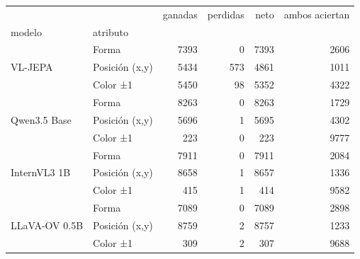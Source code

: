 \begin{tabular}{llrrrr}
\toprule
 &  & ganadas & perdidas & neto & ambos aciertan \\
modelo & atributo &  &  &  &  \\
\midrule
\multirow[t]{3}{*}{VL-JEPA} & Forma & 7393 & 0 & 7393 & 2606 \\
 & Posición (x,y) & 5434 & 573 & 4861 & 1011 \\
 & Color ±1 & 5450 & 98 & 5352 & 4322 \\
\cline{1-6}
\multirow[t]{3}{*}{Qwen3.5 Base} & Forma & 8263 & 0 & 8263 & 1729 \\
 & Posición (x,y) & 5696 & 1 & 5695 & 4302 \\
 & Color ±1 & 223 & 0 & 223 & 9777 \\
\cline{1-6}
\multirow[t]{3}{*}{InternVL3 1B} & Forma & 7911 & 0 & 7911 & 2084 \\
 & Posición (x,y) & 8658 & 1 & 8657 & 1336 \\
 & Color ±1 & 415 & 1 & 414 & 9582 \\
\cline{1-6}
\multirow[t]{3}{*}{LLaVA-OV 0.5B} & Forma & 7089 & 0 & 7089 & 2898 \\
 & Posición (x,y) & 8759 & 2 & 8757 & 1233 \\
 & Color ±1 & 309 & 2 & 307 & 9688 \\
\cline{1-6}
\bottomrule
\end{tabular}

